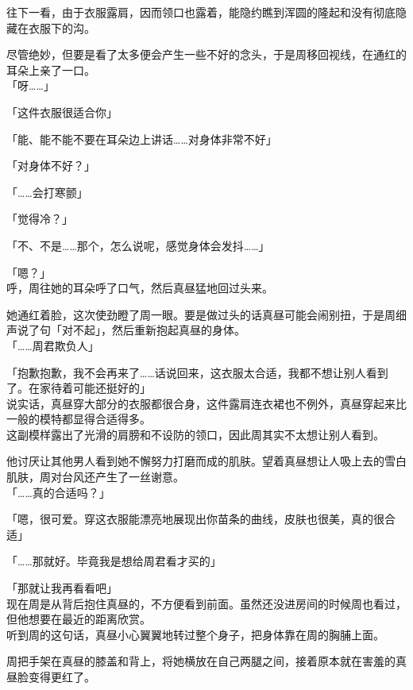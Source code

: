 往下一看，由于衣服露肩，因而领口也露着，能隐约瞧到浑圆的隆起和没有彻底隐藏在衣服下的沟。

尽管绝妙，但要是看了太多便会产生一些不好的念头，于是周移回视线，在通红的耳朵上亲了一口。\\

「呀……」

「这件衣服很适合你」

「能、能不能不要在耳朵边上讲话……对身体非常不好」

「对身体不好？」

「……会打寒颤」

「觉得冷？」

「不、不是……那个，怎么说呢，感觉身体会发抖……」

「嗯？」\\

呼，周往她的耳朵呼了口气，然后真昼猛地回过头来。

她通红着脸，这次使劲瞪了周一眼。要是做过头的话真昼可能会闹别扭，于是周细声说了句「对不起」，然后重新抱起真昼的身体。\\

「……周君欺负人」

「抱歉抱歉，我不会再来了……话说回来，这衣服太合适，我都不想让别人看到了。在家待着可能还挺好的」\\

说实话，真昼穿大部分的衣服都很合身，这件露肩连衣裙也不例外，真昼穿起来比一般的模特都显得合适得多。\\

这副模样露出了光滑的肩膀和不设防的领口，因此周其实不太想让别人看到。

他讨厌让其他男人看到她不懈努力打磨而成的肌肤。望着真昼想让人吸上去的雪白肌肤，周对台风还产生了一丝谢意。\\

「……真的合适吗？」

「嗯，很可爱。穿这衣服能漂亮地展现出你苗条的曲线，皮肤也很美，真的很合适」

「……那就好。毕竟我是想给周君看才买的」

「那就让我再看看吧」\\

现在周是从背后抱住真昼的，不方便看到前面。虽然还没进房间的时候周也看过，但他想要在最近的距离欣赏。\\

听到周的这句话，真昼小心翼翼地转过整个身子，把身体靠在周的胸脯上面。

周把手架在真昼的膝盖和背上，将她横放在自己两腿之间，接着原本就在害羞的真昼脸变得更红了。\\

